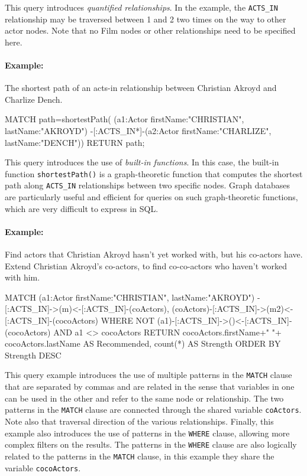 This query introduces \emph{quantified relationships}. In the example, the \texttt{ACTS\_IN} relationship may be traversed between 1 and 2 two times on the way to other actor nodes. Note that no Film nodes or other relationships need to be specified here.

\paragraph*{Example:} The shortest path of an acts-in relationship between Christian Akroyd and Charlize Dench.

\begin{samepage}
\begin{cyphercode}
MATCH path=shortestPath( 
  (a1:Actor {firstName:"CHRISTIAN", lastName:"AKROYD"}) 
  -[:ACTS_IN*]-(a2:Actor {firstName:"CHARLIZE", lastName:"DENCH"})) 
RETURN path;
\end{cyphercode}
\end{samepage}

This query introduces the use of \emph{built-in functions}. In this case, the built-in function \texttt{shortestPath()} is a graph-theoretic function that computes the shortest path along \texttt{ACTS\_IN} relationships between two specific nodes. Graph databases are particularly useful and efficient for queries on such graph-theoretic functions, which are very difficult to express in SQL.

\paragraph*{Example:} Find actors that Christian Akroyd hasn't yet worked with, but his co-actors have. Extend Christian Akroyd's co-actors, to find co-co-actors who haven't worked with him.

\begin{samepage}
\begin{cyphercode}
MATCH (a1:Actor {firstName:"CHRISTIAN", lastName:"AKROYD"})
         -[:ACTS_IN]->(m)<-[:ACTS_IN]-(coActors),
      (coActors)-[:ACTS_IN]->(m2)<-[:ACTS_IN]-(cocoActors)
WHERE NOT (a1)-[:ACTS_IN]->()<-[:ACTS_IN]-(cocoActors) 
      AND a1 <> cocoActors
RETURN cocoActors.firstName+" "+
       cocoActors.lastName AS Recommended, 
       count(*) AS Strength 
ORDER BY Strength DESC
\end{cyphercode}
\end{samepage}

This query example introduces the use of multiple patterns in the \texttt{MATCH} clause that are separated by commas and are related in the sense that variables in one can be used in the other and refer to the same node or relationship. The two patterns in the \texttt{MATCH} clause are connected through the shared variable \texttt{coActors}. Note also that traversal direction of the various relationships. Finally, this example also introduces the use of patterns in the \texttt{WHERE} clause, allowing more complex filters on the results. The patterns in the \texttt{WHERE} clause are also logically related to the patterns in the \texttt{MATCH} clause, in this example they share the variable \texttt{cocoActors}.

